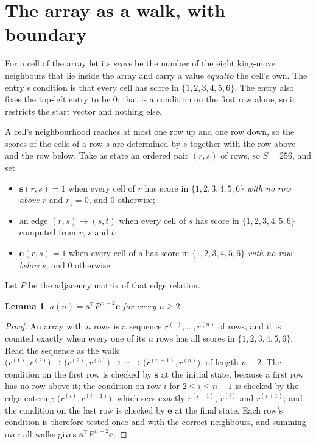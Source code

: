 \documentclass[11pt,a4paper]{article}
\theoremstyle{plain}
\newtheorem{lemma}[theorem]{Lemma}
\theoremstyle{definition}
\begin{document}
\section{The array as a walk, with boundary}

For a cell of the array let its \emph{score} be the number of the eight king-move neighbours that lie inside
the array and carry a value $equal to$ the cell's own. The entry's condition is that every cell
has score in $\{1,2,3,4,5,6\}$. The entry also fixes the top-left entry to be $0$; that is a condition on the first row alone, so it restricts the start vector and nothing else.

A cell's neighbourhood reaches at most one row up and one row down, so the scores of the
cells of a row $s$ are determined by $s$ together with the row above and the row below.
Take as state an ordered pair $(r,s)$ of rows, so $S=256$, and set
\begin{itemize}
\item $\mathbf{s}(r,s)=1$ when every cell of $r$ has score in $\{1,2,3,4,5,6\}$ \emph{with no row
above $r$} and $r_1=0$, and $0$ otherwise;
\item an edge $(r,s)\to(s,t)$ when every cell of $s$ has score in $\{1,2,3,4,5,6\}$ computed from
$r$, $s$ and $t$;
\item $\mathbf{e}(r,s)=1$ when every cell of $s$ has score in $\{1,2,3,4,5,6\}$ \emph{with no row
below $s$}, and $0$ otherwise.
\end{itemize}
Let $P$ be the adjacency matrix of that edge relation.

\begin{lemma}\label{lem:walk}
$a(n)=\mathbf{s}^{\!\top}P^{\,n-2}\mathbf{e}$ for every $n\ge2$.
\end{lemma}

\begin{proof}
An array with $n$ rows is a sequence $r^{(1)},\dots,r^{(n)}$ of rows, and it is counted
exactly when every one of its $n$ rows has all scores in $\{1,2,3,4,5,6\}$. Read the sequence as the
walk $\bigl(r^{(1)},r^{(2)}\bigr)\to\bigl(r^{(2)},r^{(3)}\bigr)\to\cdots\to
\bigl(r^{(n-1)},r^{(n)}\bigr)$, of length $n-2$. The condition on the first row is
checked by $\mathbf{s}$ at the initial state, because a first row has no row above it; the
condition on row $i$ for $2\le i\le n-1$ is checked by the edge entering
$\bigl(r^{(i)},r^{(i+1)}\bigr)$, which sees exactly $r^{(i-1)}$, $r^{(i)}$ and
$r^{(i+1)}$; and the condition on the last row is checked by $\mathbf{e}$ at the final
state. Each row's condition is therefore tested once and with the correct neighbours, and
summing over all walks gives $\mathbf{s}^{\!\top}P^{\,n-2}\mathbf{e}$.
\end{proof}
\end{document}
